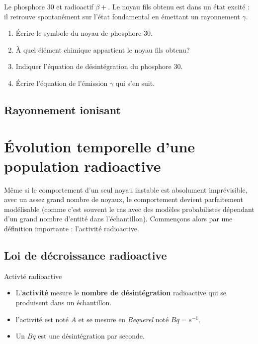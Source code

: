 \documentclass[11pt,a4paper]{article}
\begin{document}
\begin{exo}
Le phosphore 30 et radioactif $\beta+$. Le noyau fils obtenu est dans un état excité :  il retrouve spontanément sur l'état fondamental en émettant un rayonnement $\gamma$.
\begin{enumerate}
    \item Écrire le symbole du noyau de phosphore 30.
    \item À quel élément chimique appartient le noyau fils obtenu?
    \item Indiquer l'équation de désintégration du phosphore 30.
    \item Écrire l'équation de l'émission $\gamma $ qui s'en suit.
\end{enumerate}
\vspace{5.5cm}
\end{exo}

\subsection{Rayonnement ionisant}


\section{Évolution temporelle d'une population radioactive}

Même si le comportement d'un seul noyau instable est absolument imprévisible, avec un assez grand nombre de noyaux, le comportement devient parfaitement modélisable (comme c'est souvent le cas avec des modèles probabilistes dépendant d'un grand nombre d'entité dans l'échantillon). Commençons alors par une définition importante : l'activité radioactive. 

\subsection{Loi de décroissance radioactive}

\begin{defn}{Activté radioactive}
\begin{itemize}
    \item L'\textbf{activité} mesure le \textbf{nombre de désintégration} radioactive qui se produisent dans un échantillon.
    \item l'activité est noté $A$ et se mesure en \textit{Bequerel} noté $Bq = s^{-1}$. 
    \item Un $Bq$ est une désintégration par seconde. 
\end{itemize}
\end{defn}
\end{document}
